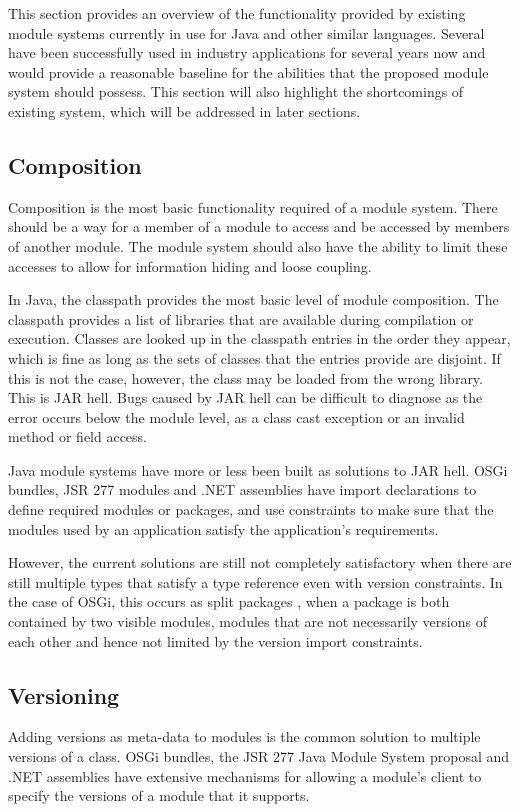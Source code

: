 This section provides an overview of the functionality provided by existing module systems currently 
in use for Java and other similar languages. 
Several \cite{javajars, OSGi4, netassemblies} have been successfully used in industry 
applications for several years now and would provide a reasonable baseline
for the abilities that the proposed module system should possess. This section will also
highlight the shortcomings of existing system, which will be addressed in later sections.

\subsection{Composition}

Composition is the most basic functionality required of a module system. There
should be a way for a member of a module to access and be accessed by members of
another module. The module system should also have the ability to limit
these accesses to allow for information hiding and loose coupling.

In Java, the classpath provides the most basic level of module composition. 
The classpath provides a list of libraries that are
available during compilation or execution. Classes are looked up in the 
classpath entries in the order they appear, which is fine as long as the sets 
of classes that the entries provide are disjoint. If this is not the case, however, the class may
be loaded from the wrong library. This is JAR hell. Bugs caused by JAR hell
can be difficult to diagnose as the error occurs below the module level, as 
a class cast exception or an invalid method or field access.

Java module systems have more or less been built as solutions to JAR hell. 
OSGi \cite{OSGi4} bundles, JSR 277 modules \cite{JSR277} and .NET assemblies \cite{netassemblies}
have import declarations to define required modules or packages, and use constraints 
to make sure that the modules used by an application satisfy the 
application's requirements. 

However, the current solutions are still not completely satisfactory when there are still multiple
types that satisfy a type reference even with version constraints. In the case
of OSGi, this occurs as split packages \cite{iJAMComments}, when a package is both contained by
two visible modules, modules that are not necessarily versions of each other
and hence not limited by the version import constraints.

\subsection{Versioning}
Adding versions as meta-data to modules is the common solution to multiple
versions of a class. OSGi bundles, the JSR 277 Java Module System
proposal and .NET assemblies have extensive mechanisms for allowing a 
module's client to specify the versions of a module that it supports.

